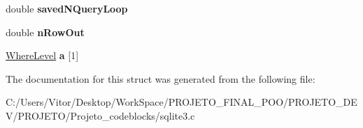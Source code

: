 \begin{DoxyCompactItemize}
\item 
\hypertarget{struct_where_info_a42261b8c4fbc968e0096fa13ea4c00a7}{double {\bfseries saved\-N\-Query\-Loop}}\label{struct_where_info_a42261b8c4fbc968e0096fa13ea4c00a7}

\item 
\hypertarget{struct_where_info_aca7831db346643eddd5520c3bce4b7bb}{double {\bfseries n\-Row\-Out}}\label{struct_where_info_aca7831db346643eddd5520c3bce4b7bb}

\item 
\hypertarget{struct_where_info_a427337160cbeaf64b23a8241fb10dbf9}{\hyperlink{struct_where_level}{Where\-Level} {\bfseries a} \mbox{[}1\mbox{]}}\label{struct_where_info_a427337160cbeaf64b23a8241fb10dbf9}

\end{DoxyCompactItemize}


The documentation for this struct was generated from the following file\-:\begin{DoxyCompactItemize}
\item 
C\-:/\-Users/\-Vitor/\-Desktop/\-Work\-Space/\-P\-R\-O\-J\-E\-T\-O\-\_\-\-F\-I\-N\-A\-L\-\_\-\-P\-O\-O/\-P\-R\-O\-J\-E\-T\-O\-\_\-\-D\-E\-V/\-P\-R\-O\-J\-E\-T\-O/\-Projeto\-\_\-codeblocks/sqlite3.\-c\end{DoxyCompactItemize}
